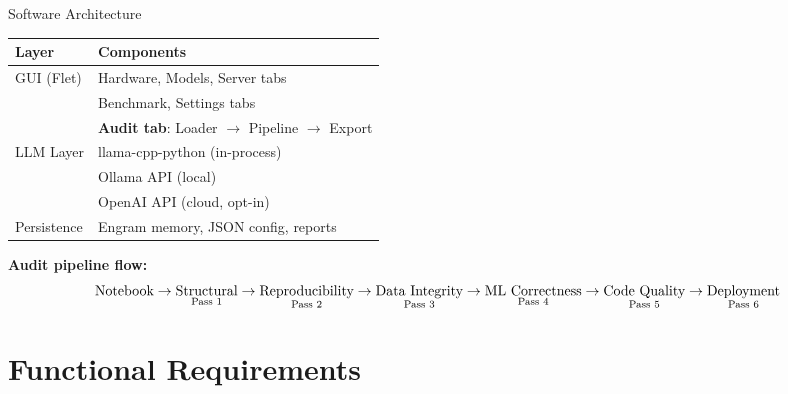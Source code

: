 \documentclass[aspectratio=169,11pt]{beamer}
\begin{document}
\begin{frame}{Software Architecture}
  \centering
  \begin{tabular}{ll}
    \toprule
    \textbf{Layer} & \textbf{Components} \\
    \midrule
    \multirow{3}{*}{GUI (Flet)} & Hardware, Models, Server tabs \\
    & Benchmark, Settings tabs \\
    & \textbf{Audit tab}: Loader $\rightarrow$ Pipeline $\rightarrow$ Export \\
    \cmidrule{2-2}
    \multirow{3}{*}{LLM Layer} & llama-cpp-python (in-process) \\
    & Ollama API (local) \\
    & OpenAI API (cloud, opt-in) \\
    \cmidrule{2-2}
    Persistence & Engram memory, JSON config, reports \\
    \bottomrule
  \end{tabular}

  \vspace{1em}
  \textbf{Audit pipeline flow:}
  \[
  \text{Notebook} \rightarrow
  \underset{\text{Pass 1}}{\text{Structural}} \rightarrow
  \underset{\text{Pass 2}}{\text{Reproducibility}} \\
  \rightarrow
  \underset{\text{Pass 3}}{\text{Data Integrity}} \rightarrow
  \underset{\text{Pass 4}}{\text{ML Correctness}} \rightarrow
  \underset{\text{Pass 5}}{\text{Code Quality}} \rightarrow
  \underset{\text{Pass 6}}{\text{Deployment}}
  \]
\end{frame}

\section{Functional Requirements}
\end{document}
